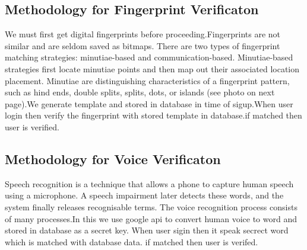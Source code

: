 \documentclass[conference]{IEEEtran}
\begin{document}
\subsection{Methodology for Fingerprint Verificaton}
We must first get digital fingerprints before proceeding.Fingerprints are not similar and are seldom saved as bitmaps. There are two types of fingerprint matching strategies: minutiae-based and communication-based.
Minutiae-based strategies first locate minutiae points and then map out their associated location placement. Minutiae are distinguishing characteristics of a fingerprint pattern, such as hind ends, double splits, splits, dots, or islands (see photo on next page).We generate template and stored in database in time of sigup.When user login then verify the fingerprint with stored template in database.if matched then user is verified.
\subsection{Methodology for Voice Verificaton}
Speech recognition is a technique that allows a phone to capture human speech using a microphone. A speech impairment later detects these words, and the system finally releases recognisable terms. The voice recognition process consists of many processes.In this we use google api to convert human voice to word and stored in database as a secret key. When user sigin then it speak secrect word which is matched with database data. if matched then user is verifed.
\end{document}
